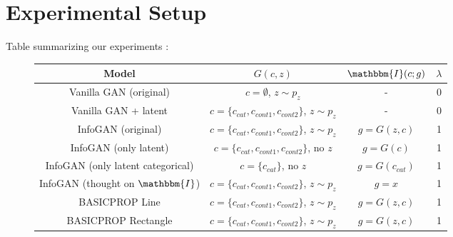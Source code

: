 \documentclass{article}
\newcommand{\I}{\mathbbm{I}}
\begin{document}


\section{Experimental Setup}

Table summarizing our experiments
:

\begin{figure}[ht]
\centering
\begin{tabular}{|c|c|c|c|}\hline
   Model & $G(c,z)$ & $\I(c; g)$ & $\lambda$ \\\hline\hline
   Vanilla GAN (original) & $c=\emptyset$, $z\sim p_z$ & - & 0\\\hline
   Vanilla GAN + latent & $c=\{c_{cat}, c_{cont1}, c_{cont2}\}$, $z\sim p_z$ & - & 0\\\hline
   InfoGAN (original) & $c=\{c_{cat}, c_{cont1}, c_{cont2}\}$, $z\sim p_z$ & $g=G(z,c)$ & 1 \\\hline
   InfoGAN (only latent) & $c=\{c_{cat}, c_{cont1}, c_{cont2}\}$, no $z$ & $g = G(c) $ & 1 \\\hline
   InfoGAN (only latent categorical)  & $c=\{c_{cat}\}$, no $z$  & $g = G(c_{cat})$ & 1 \\\hline
   InfoGAN (thought on $\I$) & $c=\{c_{cat}, c_{cont1}, c_{cont2}\}$, $z\sim p_z$ & $g=x$ & 1 \\\hline
   BASICPROP Line & $c=\{c_{cat}, c_{cont1}, c_{cont2}\}$, $z\sim p_z$ & $g=G(z,c)$ & 1 \\\hline
   BASICPROP Rectangle & $c=\{c_{cat}, c_{cont1}, c_{cont2}\}$, $z\sim p_z$ & $g=G(z,c)$ & 1 \\\hline
\end{tabular}
\end{figure}
\end{document}
